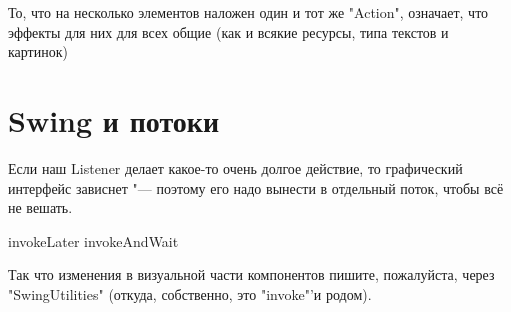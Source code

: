 
То, что на несколько элементов наложен один и тот же \java"Action", означает, что эффекты для них для всех общие (как и всякие ресурсы, типа текстов и картинок)


\section{Swing и потоки}
Если наш Listener делает какое-то очень долгое действие, то графический интерфейс зависнет 
"--- поэтому его надо вынести в отдельный поток, чтобы всё не вешать.

invokeLater
invokeAndWait

Так что изменения в визуальной части компонентов пишите, пожалуйста, через \java"SwingUtilities" 
(откуда, собственно, это \java"invoke"'и родом).


